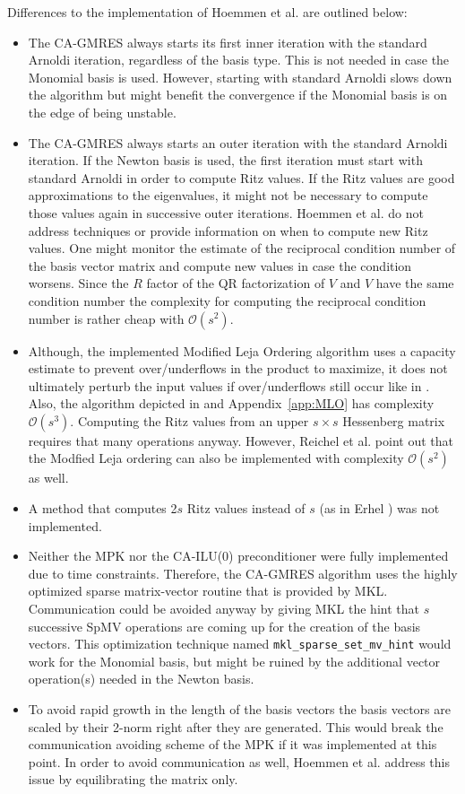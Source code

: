 \documentclass{scrartcl}
\numberwithin{equation}{section}
\begin{document}
Differences to the implementation of Hoemmen et al. \cite{Hoemmen:2010:CKS:1970638} are outlined below:
\begin{itemize}
\item The CA-GMRES always starts its first inner iteration with the standard Arnoldi iteration, regardless of the basis type. This is not needed in case the Monomial basis is used. However, starting with standard Arnoldi slows down the algorithm but might benefit the convergence if the Monomial basis is on the edge of being unstable.
\item The CA-GMRES always starts an outer iteration with the standard Arnoldi iteration. If the Newton basis is used, the first iteration must start with standard Arnoldi in order to compute Ritz values. If the Ritz values are good approximations to the eigenvalues, it might not be necessary to compute those values again in successive outer iterations. Hoemmen et al. \cite{Hoemmen:2010:CKS:1970638} do not address techniques or provide information on when to compute new Ritz values. One might monitor the estimate of the reciprocal condition number of the basis vector matrix and compute new values in case the condition worsens. Since the $R$ factor of the QR factorization of $V$ and $V$ have the same condition number the complexity for computing the reciprocal condition number is rather cheap with $\mathcal{O}(s^2)$.
\item Although, the implemented Modified Leja Ordering algorithm uses a capacity estimate to prevent over/underflows in the product to maximize, it does not ultimately perturb the input values if over/underflows still occur like in \cite{Hoemmen:2010:CKS:1970638}. Also, the algorithm depicted in \cite{Hoemmen:2010:CKS:1970638} and Appendix~\ref{app:MLO} has complexity $\mathcal{O}(s^3)$. Computing the Ritz values from an upper $s \times s$ Hessenberg matrix requires that many operations anyway. However, Reichel et al. \cite{Reichel1990} point out that the Modfied Leja ordering can also be implemented with complexity $\mathcal{O}(s^2)$ as well.
\item A method that computes 2$s$ Ritz values instead of $s$ (as in Erhel \cite{Erhel95aparallel}) was not implemented.
\item Neither the MPK nor the CA-ILU(0) preconditioner were fully implemented due to time constraints. Therefore, the CA-GMRES algorithm uses the highly optimized sparse matrix-vector routine that is provided by MKL.  Communication could be avoided anyway by giving MKL the hint that $s$ successive SpMV operations are coming up for the creation of the basis vectors. This optimization technique named \texttt{mkl\_sparse\_set\_mv\_hint} would work for the Monomial basis, but might be ruined by the additional vector operation(s) needed in the Newton basis.
\item To avoid rapid growth in the length of the basis vectors the basis vectors are scaled by their 2-norm right after they are generated. This would break the communication avoiding scheme of the MPK if it was implemented at this point. In order to avoid communication as well, Hoemmen et al. \cite{Hoemmen:2010:CKS:1970638} address this issue by equilibrating the matrix only.
\end{itemize}
\end{document}
